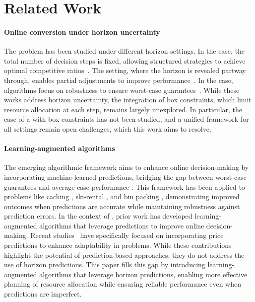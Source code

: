 \section{Related Work}
\paragraph{Online conversion under horizon uncertainty} 
The \OC problem has been studied under different horizon settings. In the \OCK case, the total number of decision steps is fixed, allowing structured strategies to achieve optimal competitive ratios~\cite{time_series_search_2001,k_search_2009}. The \OCN setting, where the horizon is revealed partway through, enables partial adjustments to improve performance~\cite{lechowicz2024online,Sun_MultipleKnapsack_2020}. In the \OCU case, algorithms focus on robustness to ensure worst-case guarantees~\cite{tan2023threshold,lin2019competitive}. While these works address horizon uncertainty, the integration of box constraints, which limit resource allocation at each step, remains largely unexplored. In particular, the case of a \OCK with box constraints has not been studied, and a unified framework for all settings remain open challenges, which this work aims to resolve.

\paragraph{Learning-augmented algorithms}
The emerging algorithmic framework aims to enhance online decision-making by incorporating machine-learned predictions, bridging the gap between worst-case guarantees and average-case performance \cite{lykouris2021competitive,purohit2018improving}. This framework has been applied to problems like caching \cite{lykouris2021competitive}, ski-rental \cite{purohit2018improving}, and bin packing \cite{angelopoulos2023online}, demonstrating improved outcomes when predictions are accurate while maintaining robustness against prediction errors. In the context of \OC, prior work has developed learning-augmented algorithms that leverage predictions to improve online decision-making. Recent studies~\cite{angelopoulos2022online,angelopoulos2024overcoming,sun2021pareto} have specifically focused on incorporating price predictions to enhance adaptability in \OC problems. While these contributions highlight the potential of prediction-based approaches, they do not address the use of horizon predictions. This paper fills this gap by introducing learning-augmented algorithms that leverage horizon predictions, enabling more effective planning of resource allocation while ensuring reliable performance even when predictions are imperfect.

